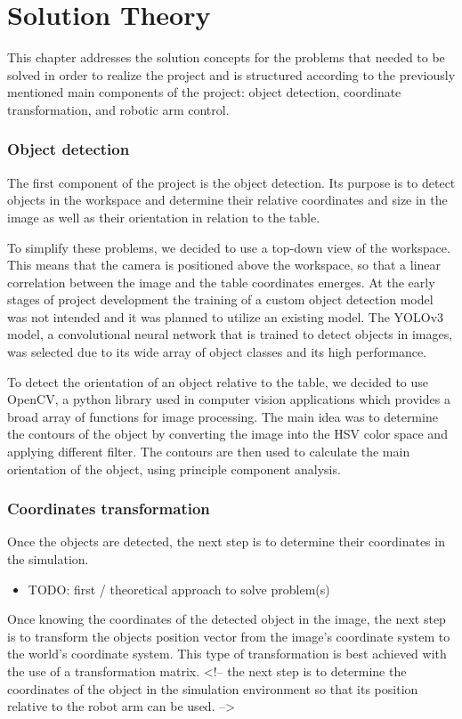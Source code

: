
\chapter{Solution Theory} %
\label{theory} %


This chapter addresses the solution concepts for the problems that needed to be solved in order to realize the project and is structured according to the previously mentioned main components of the project: object detection, coordinate transformation, and robotic arm control. 
 
\subsection{Object detection}
The first component of the project is the object detection. Its purpose is to detect objects in the workspace and determine their relative coordinates and size in the image as well as their orientation in relation to the table. 

To simplify these problems, we decided to use a top-down view of the workspace. This means that the camera is positioned above the workspace, so that a linear correlation between the image and the table coordinates emerges. At the early stages of project development the training of a custom object detection model was not intended and it was planned to utilize an existing model. The YOLOv3 model, a convolutional neural network that is trained to detect objects in images, was selected due to its wide array of object classes and its high performance.

To detect the orientation of an object relative to the table, we decided to use OpenCV, a python library used in computer vision applications which provides a broad array of functions for image processing. The main idea was to determine the contours of the object by converting the image into the HSV color space and applying different filter. The contours are then used to calculate the main orientation of the object, using principle component analysis. 

\subsection{Coordinates transformation}

Once the objects are detected, the next step is to determine their coordinates in the simulation. 

\begin{itemize}
    \item TODO: first / theoretical approach to solve problem(s)
\end{itemize}
Once knowing the coordinates of the detected object in the image, 
the next step is to transform the objects position vector from the image's coordinate system to the world's coordinate system. This type of transformation is best achieved with the use of a transformation matrix.
<!-- the next step is to determine the coordinates of the object in the simulation environment so that its position relative to the robot arm can be used. -->

